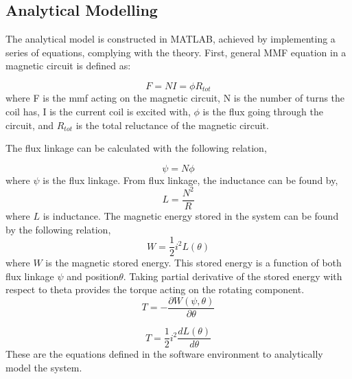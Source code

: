 \documentclass[a4paper, 11pt]{article}
\begin{document}
\subsection{Analytical Modelling}
The analytical model is constructed in MATLAB, achieved by implementing a series of equations, complying with the theory. First, general MMF equation in a magnetic circuit is defined as:

\begin{equation}
	F=NI=\phi R_{tot}
	\label{MMF&H}
\end{equation}
where F is the mmf acting on the magnetic circuit, N is the number of turns the coil has, I is the current coil is excited with, $\phi$ is the flux going through the circuit, and $R_{tot}$ is the total reluctance of the magnetic circuit.

The flux linkage can be calculated with the following relation,

\begin{equation}
	\psi=N\phi
	\label{Flux Linkage}
\end{equation}
where $\psi$ is the flux linkage. 
From flux linkage, the inductance can be found by,
\begin{equation}
	L=\frac{N^2}{R}
	\label{inductance}
\end{equation}
where $L$ is inductance.
The magnetic energy stored in the system can be found by the following relation,
\begin{equation}
	W=\frac{1}{2}i^2 L (\theta)
	\label{magnetic stored energy}
\end{equation}
where $W$ is the magnetic stored energy. This stored energy is a function of both flux linkage $\psi$ and position$\theta$. Taking partial derivative of the stored energy with respect to theta provides the torque acting on the rotating component.
\begin{equation}
	T=-\frac{\partial W(\psi ,\theta)}{\partial \theta}
	\label{Torque}
\end{equation}

\begin{equation}
	T=\frac{1}{2}i^2 \frac{dL(\theta)}{d\theta}
	\label{Torque}
\end{equation}
These are the equations defined in the software environment to analytically model the system.
\end{document}
